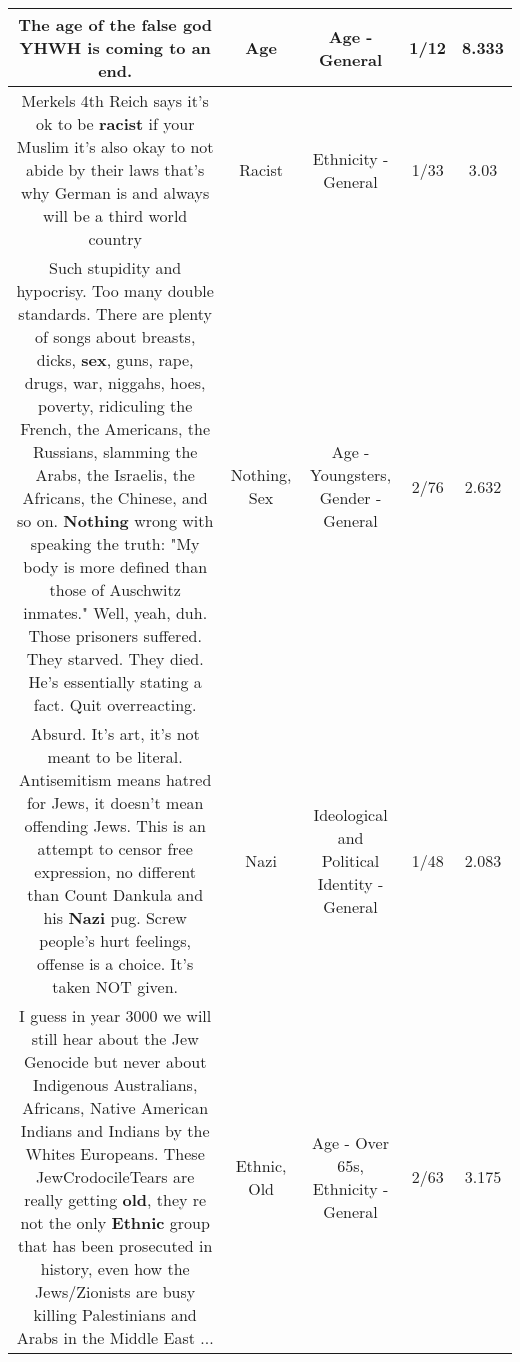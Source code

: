 \documentclass[11pt]{article}
\newlength\mylength
\begin{document}
\begin{center}
\begin{longtable}{|C{.65\mylength}|C{.30\mylength}|C{.12\mylength}|C{.12\mylength}|C{.12\mylength}|}
  \small The \textbf{age} of the false god YHWH is coming to an end.\normalsize   & Age & Age - General & 1/12 & 8.333 \\  \hline
  \small Merkels 4th Reich says it's ok to be \textbf{racist} if your Muslim it's also okay to not abide by their laws that's why German is and always will be a third world country\normalsize   & Racist & Ethnicity - General & 1/33 & 3.03 \\  \hline
  \small Such stupidity and hypocrisy. Too many double standards. There are plenty of songs about breasts, dicks, \textbf{sex}, guns, rape, drugs, war, niggahs, hoes, poverty, ridiculing the French, the Americans, the Russians, slamming the Arabs, the Israelis, the Africans, the Chinese, and so on. \textbf{Nothing} wrong with speaking the truth: "My body is more defined than those of Auschwitz inmates." Well, yeah, duh. Those prisoners suffered. They starved. They died. He's essentially stating a fact. Quit overreacting.\normalsize   & Nothing, Sex & Age - Youngsters, Gender - General & 2/76 & 2.632 \\  \hline
  \small Absurd. It's art, it's not meant to be literal. Antisemitism means hatred for Jews, it doesn't mean offending Jews. This is an attempt to censor free expression, no different than Count Dankula and his \textbf{Nazi} pug. Screw people's hurt feelings, offense is a choice. It's taken NOT given.\normalsize   & Nazi &  Ideological and Political Identity - General & 1/48 & 2.083 \\  \hline
  \small I guess in year 3000 we will still hear about the Jew Genocide but never about Indigenous Australians, Africans, Native American Indians and Indians by the Whites  Europeans. These JewCrodocileTears are really getting \textbf{old}, they re not the only \textbf{Ethnic} group that has been prosecuted in history, even how the Jews/Zionists are busy killing Palestinians and Arabs in the Middle East ...\normalsize   & Ethnic, Old & Age - Over 65s, Ethnicity - General & 2/63 & 3.175 \\  \hline

\end{longtable}
\end{center}
\end{document}
